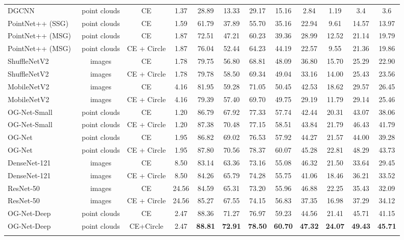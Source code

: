 \documentclass[journal]{IEEEtran}
\begin{document}
\begin{table*}
\begin{center}
\begin{tabular}{l|c|c|c|cc|cc|cc|cc}
DGCNN ~\cite{wang2019dynamic} & point clouds  & CE & 1.37 & 28.89 & 13.33 & 29.17 & 15.16 & 2.84 & 1.19 & 3.4 & 3.6 \\
PointNet++ (SSG)~\cite{qi2017pointnet++} & point clouds & CE & 1.59 & 61.79 & 37.89 & 55.70 & 35.16 & 22.94 & 9.61 & 14.57 & 13.97 \\
PointNet++ (MSG)~\cite{qi2017pointnet++} & point clouds & CE & 1.87 & 72.51 & 47.21 & 60.23 & 39.36 & 28.99 & 12.52 & 21.14 & 19.79\\
PointNet++ (MSG)~\cite{qi2017pointnet++} & point clouds & CE + Circle & 1.87 & 76.04 & 52.44 & 64.23 & 44.19 & 22.57 & 9.55 & 21.36 & 19.86 \\
\hline
ShuffleNetV2~\cite{zhang2018shufflenet} & images & CE & 1.78 & 79.75 & 56.80 & 68.81 & 48.09 & 36.80 & 15.70 & 25.29 & 22.90 \\
ShuffleNetV2~\cite{zhang2018shufflenet} & images & CE + Circle & 1.78 & 79.78 & 58.50 & 69.34 & 49.04 & 33.16 & 14.00 & 25.43& 23.56\\
MobileNetV2~\cite{sandler2018mobilenetv2} & images & CE & 4.16 & 81.95 & 59.28 & 71.05 & 50.45 & 42.53 & 18.62 & 29.57 & 26.45 \\
MobileNetV2~\cite{sandler2018mobilenetv2} & images & CE + Circle & 4.16 & 79.39 & 57.40 & 69.70 & 49.75 & 29.19 & 11.79 & 29.14 & 25.46 \\ 
\hline
OG-Net-Small & point clouds & CE & 1.20 & 86.79 & 67.92 & 77.33 & 57.74 & 42.44 & 20.31 & 43.07 & 38.06 \\ OG-Net-Small & point clouds & CE + Circle & 1.20
& 87.38 & 70.48 & 77.15 & 58.51 & 43.84 & 21.79 & 46.43 & 41.79\\
OG-Net & point clouds  & CE & 1.95 & 86.82 & 69.02 & 76.53 & 57.92 & 44.27 & 21.57 & 44.00 & 39.28 
 \\
OG-Net & point clouds & CE + Circle & 1.95 & 
87.80 & 70.56 & 78.37 & 60.07 & 45.28 & 22.81 & 48.29 & 43.73 \\
\shline
DenseNet-121~\cite{Huang2017Densely} & images & CE & 8.50 & 83.14 & 63.36 & 73.16 & 55.08 & 46.32 & 21.50 & 33.64 & 29.45\\
DenseNet-121~\cite{Huang2017Densely} & images & CE + Circle & 8.50 & 84.26 & 65.79 & 74.28 & 55.75 & 41.06 & 18.46 & 36.21 & 33.52 \\
ResNet-50~\cite{he2016deep} & images & CE & 24.56 & 84.59 & 65.31 & 73.20 & 55.96 & 46.88 & 22.25 & 35.43 & 32.09\\
ResNet-50~\cite{he2016deep} & images & CE + Circle & 24.56 & 85.27 & 67.55 & 74.15 & 56.83 & 37.35 & 16.98 & 37.29 & 34.12 \\
\hline
OG-Net-Deep & point clouds  & CE & 2.47 & 88.36 & 71.27 &  76.97 & 59.23 & 44.56 & 21.41 & 45.71 & 41.15\\
OG-Net-Deep & point clouds  & CE+Circle & 2.47 & \textbf{88.81} & \textbf{72.91} & \textbf{78.50} & \textbf{60.70} & \textbf{47.32} & \textbf{24.07} & \textbf{49.43} & \textbf{45.71} \\
\shline
\end{tabular}
\end{center}
\end{table*}
\end{document}
